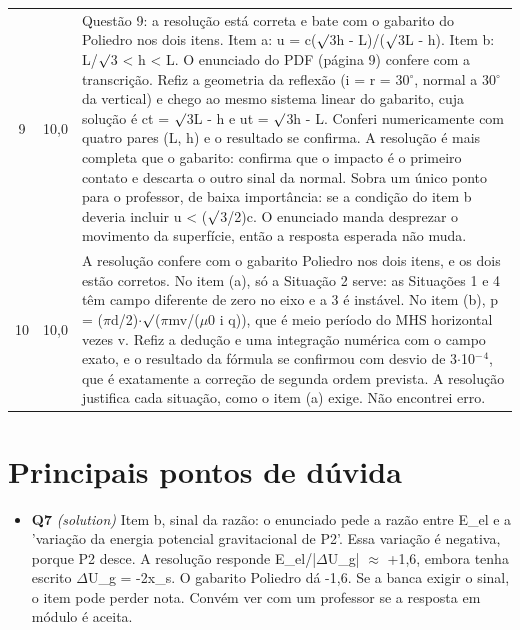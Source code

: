 \documentclass{article}%
\begin{document}
\begin{longtable}{@{}c c p{}@{}}
9 & 10,0 & Questão 9: a resolução está correta e bate com o gabarito do Poliedro nos dois itens. Item a: u = c($\surd$3h - L)/($\surd$3L - h). Item b: L/$\surd$3 < h < L. O enunciado do PDF (página 9) confere com a transcrição. Refiz a geometria da reflexão (i = r = 30$^\circ$, normal a 30$^\circ$ da vertical) e chego ao mesmo sistema linear do gabarito, cuja solução é ct = $\surd$3L - h e ut = $\surd$3h - L. Conferi numericamente com quatro pares (L, h) e o resultado se confirma. A resolução é mais completa que o gabarito: confirma que o impacto é o primeiro contato e descarta o outro sinal da normal. Sobra um único ponto para o professor, de baixa importância: se a condição do item b deveria incluir u < ($\surd$3/2)c. O enunciado manda desprezar o movimento da superfície, então a resposta esperada não muda. \\
10 & 10,0 & A resolução confere com o gabarito Poliedro nos dois itens, e os dois estão corretos. No item (a), só a Situação 2 serve: as Situações 1 e 4 têm campo diferente de zero no eixo e a 3 é instável. No item (b), p = ($\pi$d/2)$\cdot$$\surd$($\pi$mv/($\mu$0 i q)), que é meio período do MHS horizontal vezes v. Refiz a dedução e uma integração numérica com o campo exato, e o resultado da fórmula se confirmou com desvio de 3$\cdot$10$^{-}$$^{4}$, que é exatamente a correção de segunda ordem prevista. A resolução justifica cada situação, como o item (a) exige. Não encontrei erro. \\
\bottomrule\end{longtable}%
\section*{Principais pontos de dúvida}%
\begin{itemize}%
\item%
\textbf{Q7} \textit{(solution)} Item b, sinal da razão: o enunciado pede a razão entre E\_el e a 'variação da energia potencial gravitacional de P2'. Essa variação é negativa, porque P2 desce. A resolução responde E\_el/|$\Delta$U\_g| $\approx$ +1,6, embora tenha escrito $\Delta$U\_g = -2x\_s. O gabarito Poliedro dá -1,6. Se a banca exigir o sinal, o item pode perder nota. Convém ver com um professor se a resposta em módulo é aceita.%
\end{itemize}%
\end{document}
